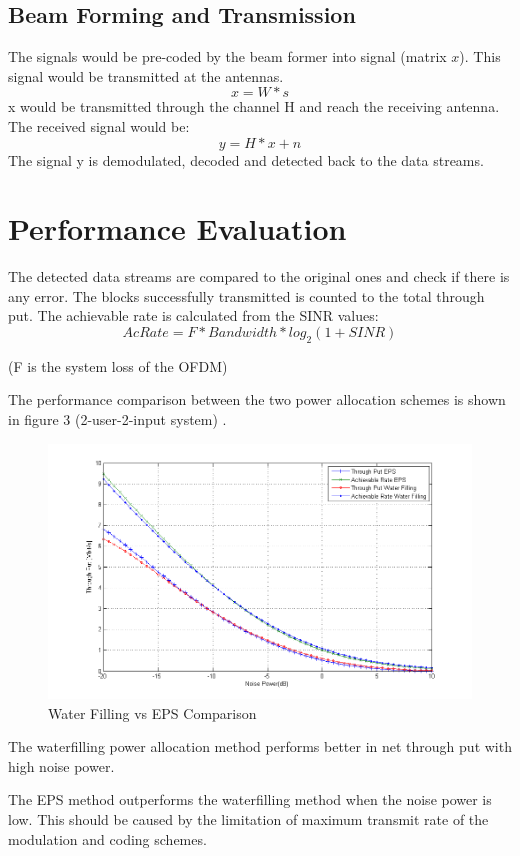 \documentclass{article}
\begin{document}
\subsection{Beam Forming and Transmission}
The signals would be pre-coded by the beam former into signal (matrix $x$). This signal would be transmitted at the antennas.
$$x = W*s$$
x would be transmitted through the channel H and reach the receiving antenna.
The received signal would be:
$$y = H*x+n$$
The signal y is demodulated, decoded and detected back to the data streams.

\section{Performance Evaluation}
The detected data streams are compared to the original ones and check if there is any error. The blocks successfully transmitted is counted to the total through put.
The achievable rate is calculated from the SINR values:
$$AcRate = F*Bandwidth*log_2(1+SINR)$$
\begin{center}(F is the system loss of the OFDM)\end{center}
The performance comparison between the two power allocation schemes is shown in figure 3 (2-user-2-input system) .


\begin{figure}[ht]
\centering
\includegraphics[scale=0.45]{WFvsEPS.png}
\caption{Water Filling vs EPS Comparison}
\label{fig:MUSOvsSISO}
\end{figure}
The waterfilling power allocation method performs better in net through put with high noise power.

The EPS method outperforms the waterfilling method when the noise power is low. This should be caused by the limitation of maximum transmit rate of the modulation and coding schemes.
\end{document}
